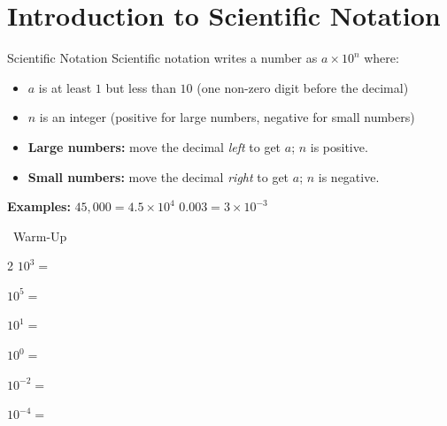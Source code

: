 \section{Introduction to Scientific Notation}

\begin{quickReview}{Scientific Notation}
Scientific notation writes a number as $a \times 10^n$ where:
\begin{itemize}[leftmargin=*]
    \item $a$ is at least $1$ but less than $10$ (one non-zero digit before the decimal)
    \item $n$ is an integer (positive for large numbers, negative for small numbers)
    \item \textbf{Large numbers:} move the decimal \emph{left} to get $a$; $n$ is positive.
    \item \textbf{Small numbers:} move the decimal \emph{right} to get $a$; $n$ is negative.
\end{itemize}

\medskip
\textbf{Examples:} $45{,}000 = 4.5 \times 10^4$ \qquad $0.003 = 3 \times 10^{-3}$
\end{quickReview}

\begin{practiceBox}[funGreen]{\faSun~Warm-Up}


\begin{multicols}{2}
\prob $10^3 =$ \answerBlank[2cm]

\prob $10^5 =$ \answerBlank[2cm]

\prob $10^1 =$ \answerBlank[2cm]

\prob $10^0 =$ \answerBlank[2cm]

\prob $10^{-2} =$ \answerBlank[2cm]

\prob $10^{-4} =$ \answerBlank[2cm]
\end{multicols}
\end{practiceBox}

